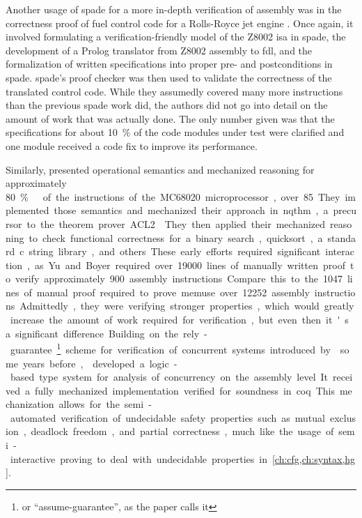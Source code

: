 Another usage of \ac{spade} for a more in-depth verification of assembly
was in the correctness proof of fuel control code for a Rolls-Royce
jet engine \autocite{oneill1988verification}. Once again,
it involved formulating a verification-friendly model of the Z8002 \ac{isa}
in \ac{spade}, the development of a Prolog translator from Z8002 assembly to \ac{fdl},
and the formalization of written specifications into proper pre- and postconditions
in \ac{spade}. \Ac{spade}'s proof checker was then used to validate the correctness
of the translated control code. While they assumedly covered many more instructions
than the previous \ac{spade} work did, the authors did not go into detail
on the amount of work that was actually done.
The only number given was that the specifications for about \SI{10}{\percent}
of the code modules under test were clarified
and one module received a code fix to improve its performance.

Similarly, \textcite{yu1993automated,boyer1996automated}
presented operational semantics and mechanized reasoning
for approximately \SI{80}\percent\ of the instructions of the MC68020 microprocessor, over \num{85}.
They implemented those semantics and mechanized their approach
in \ac{nqthm}, a precursor to the theorem prover ACL2 \autocite{ACL2}.
They then applied their mechanized reasoning to check functional correctness
for a binary search, quicksort, a standard \gls{c} string library, and others.
These early efforts required significant interaction,
as Yu and Boyer required over \num{19000}
lines of manually written proof to verify approximately \num{900} assembly instructions.
Compare this to the \num{1047} lines of manual proof
required to prove \gls{memuse} over \num{12252} assembly instructions.
Admittedly, they were verifying stronger properties,
which would greatly increase the amount of work required for verification,
but even then it's a significant difference.

Building on the rely-guarantee\footnote{or ``assume-guarantee'', as the paper calls it} scheme for verification of concurrent systems introduced by \textcite{xu1997rely-guarantee} some years before,
\textcite{yu2004concurrent} developed a logic-based type system for analysis of concurrency on the assembly level.
It received a fully mechanized implementation verified for soundness in \gls{coq}.
This mechanization allows for the semi-automated verification of undecidable safety properties such as mutual exclusion, deadlock freedom, and partial correctness, much like the usage of semi-interactive proving to deal with undecidable properties in \cref{ch:cfg,ch:syntax,hg}.

